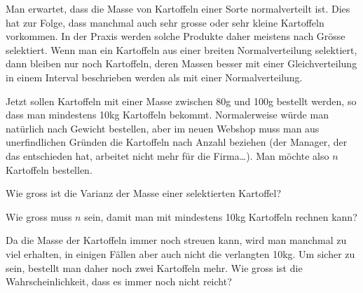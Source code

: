 Man erwartet, dass die Masse von Kartoffeln einer Sorte normalverteilt ist.
Dies hat zur Folge, dass manchmal auch sehr grosse oder sehr kleine 
Kartoffeln vorkommen.
In der Praxis werden solche Produkte daher meistens nach Grösse
selektiert.
Wenn man ein Kartoffeln aus einer breiten Normalverteilung selektiert,
dann bleiben nur noch Kartoffeln, deren Massen besser mit einer
Gleichverteilung in einem Interval beschrieben werden als mit einer
Normalverteilung.

Jetzt sollen Kartoffeln mit einer Masse zwischen 80g und 100g bestellt
werden, so dass man mindestens 10kg Kartoffeln bekommt.
Normalerweise würde man natürlich nach Gewicht bestellen, aber im neuen
Webshop muss man aus unerfindlichen Gründen die Kartoffeln
nach Anzahl beziehen
(der Manager, der das entschieden hat, arbeitet nicht mehr für die Firma\dots).
Man möchte also $n$ Kartoffeln bestellen.

\begin{teilaufgaben}
\item
Wie gross ist die Varianz der Masse einer selektierten Kartoffel?
\item
Wie gross muss $n$ sein, damit man mit mindestens 10kg Kartoffeln rechnen kann?
\item
Da die Masse der Kartoffeln immer noch streuen kann, wird
man manchmal zu viel erhalten, 
in einigen Fällen aber auch nicht die verlangten 10kg.
Um sicher zu sein, bestellt man daher noch zwei Kartoffeln mehr.
Wie gross ist die Wahrscheinlichkeit, dass es immer noch nicht reicht?
\end{teilaufgaben}

